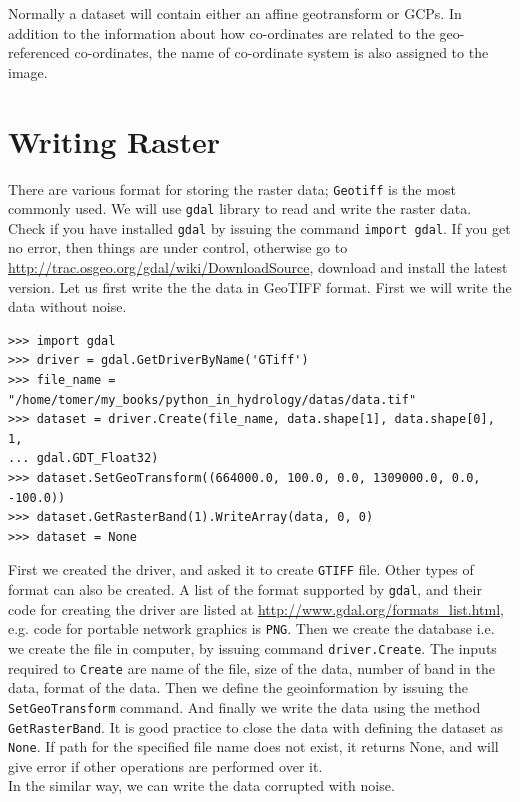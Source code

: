 \documentclass[10pt]{book}
\begin{document}
{Normally a dataset will contain either an affine geotransform or GCPs. In addition to the information about how co-ordinates are related to the geo-referenced co-ordinates, the name of co-ordinate system is also assigned to the image. 

\section{Writing Raster}
There are various format for storing the raster data; \verb"Geotiff" is the most commonly used. We will use \verb"gdal" library to read and write the raster data. Check if you have installed \verb"gdal" by issuing the command \verb"import gdal". If you get no error, then things are under control, otherwise go to \url{http://trac.osgeo.org/gdal/wiki/DownloadSource}, download and install the latest version. Let us first write the the data in GeoTIFF format. First we will write the data without noise.
\beforeverb \begin{verbatim}
>>> import gdal
>>> driver = gdal.GetDriverByName('GTiff')
>>> file_name = "/home/tomer/my_books/python_in_hydrology/datas/data.tif"
>>> dataset = driver.Create(file_name, data.shape[1], data.shape[0], 1, 
... gdal.GDT_Float32)
>>> dataset.SetGeoTransform((664000.0, 100.0, 0.0, 1309000.0, 0.0, -100.0))
>>> dataset.GetRasterBand(1).WriteArray(data, 0, 0)
>>> dataset = None
\end{verbatim} \afterverb

First we created the driver, and asked it to create \verb"GTIFF" file. Other types of format can also be created. A list of the format supported by \verb"gdal", and their code for creating the driver are listed at \url{http://www.gdal.org/formats_list.html}, e.g. code for portable network graphics is \verb"PNG". Then we create the database i.e. we create the file in computer, by issuing command \verb"driver.Create". The inputs required to \verb"Create" are name of the file, size of the data, number of band in the data, format of the data. Then we define the geoinformation by issuing the \verb"SetGeoTransform" command. And finally we write the data using the method \verb"GetRasterBand". It is good practice to close the data with defining the dataset as \verb"None". If path for the specified file name does not exist, it returns None, and will give error if other operations are performed over it. \\

In the similar way, we can write the data corrupted with noise. 

}
\end{document}
